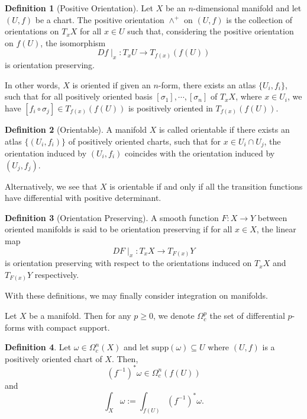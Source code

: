 \documentclass[]{article}
\theoremstyle{definition}
\theoremstyle{definition}
\newtheorem{definition}{Definition}[section]
\begin{document}
\begin{definition}[Positive Orientation]
  Let \(X\) be an \(n\)-dimensional manifold and let \((U, f)\) be a chart. 
  The positive orientation \(\wedge^+\) on \((U, f)\) is the collection of 
  orientations on \(T_x X\) for all \(x \in U\) such that, considering the 
  positive orientation on \(f(U)\), the isomorphism 
  \[Df\mid_x : T_x U \to T_{f(x)}(f(U))\]
  is orientation preserving.
\end{definition}
In other words, \(X\) is oriented if given an \(n\)-form, there exists an atlas 
\(\{U_i, f_i\}\), such that for all positively oriented basis 
\([\sigma_1], \cdots, [\sigma_n]\) of \(T_x X\), where \(x \in U_i\), we have 
\([f_i \circ \sigma_j] \in T_{f(x)}(f(U))\) is positively oriented in 
\(T_{f(x)}(f(U))\).

\begin{definition}[Orientable]
  A manifold \(X\) is called orientable if there exists an atlas \(\{(U_i, f_i)\}\) 
  of positively oriented charts, such that for \(x \in U_i \cap U_j\), the 
  orientation induced by \((U_i, f_i)\) coincides with the orientation induced 
  by \((U_j, f_j)\).
\end{definition}

Alternatively, we see that \(X\) is orientable if and only if all the transition 
functions have differential with positive determinant.

\begin{definition}[Orientation Preserving]
  A smooth function \(F : X \to Y\) between oriented manifolds is said to be 
  orientation preserving if for all \(x \in X\), the linear map 
  \[DF\mid_x : T_x X \to T_{F(x)}Y\]
  is orientation preserving with respect to the orientations induced on 
  \(T_x X\) and \(T_{F(x)}Y\) respectively.
\end{definition}

With these definitions, we may finally consider integration on manifolds.

Let \(X\) be a manifold. Then for any \(p \ge 0\), we denote \(\Omega^p_c\) the 
set of differential \(p\)-forms with compact support.

\begin{definition}
  Let \(\omega \in \Omega^n_c(X)\) and let \(\text{supp}(\omega) \subseteq U\) 
  where \((U, f)\) is a positively oriented chart of \(X\). Then, 
  \[(f^{-1})^* \omega \in \Omega_c^n(f(U))\]
  and 
  \[\int_X \omega := \int_{f(U)}(f^{-1})^* \omega.\]
\end{definition}
\end{document}
